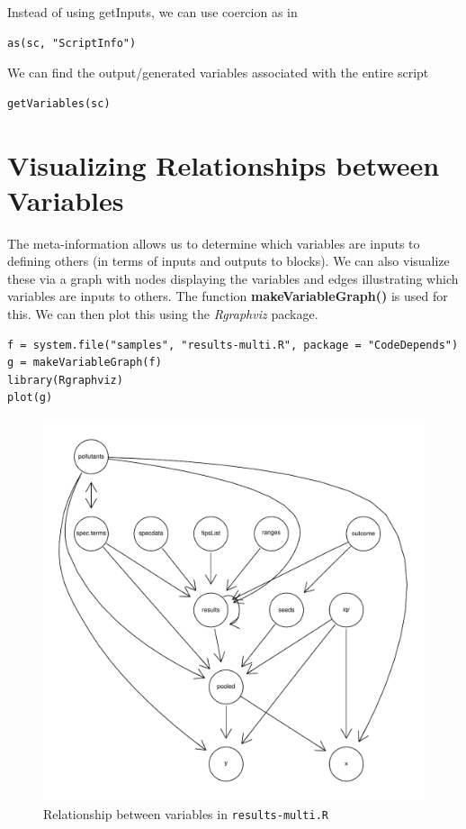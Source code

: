 \documentclass{article}
\def\Rfunc#1{\textbf{#1()}}
\def\Rpkg#1{\textsl{#1}}
\begin{document}
Instead of using getInputs, we can use coercion as in
\begin{verbatim}
as(sc, "ScriptInfo")
\end{verbatim}

We can find the output/generated variables associated with the entire script
\begin{verbatim}
getVariables(sc)
\end{verbatim}


\section{Visualizing Relationships between Variables}
The meta-information allows us to determine which variables are inputs
to defining others (in terms of inputs and outputs to blocks).  We can
also visualize these via a graph with nodes displaying the variables
and edges illustrating which variables are inputs to others.  The
function \Rfunc{makeVariableGraph} is used for this. We can then plot this
using the \Rpkg{Rgraphviz} package.
\begin{verbatim}
f = system.file("samples", "results-multi.R", package = "CodeDepends")
g = makeVariableGraph(f)
library(Rgraphviz)
plot(g)
\end{verbatim}
\begin{figure}
  \centering
  \includegraphics{variableGraph.pdf}
  \caption{Relationship between variables in \texttt{results-multi.R}}
\end{figure}
\end{document}

